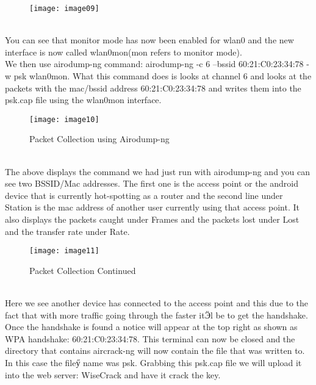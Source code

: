\documentclass[12pt, titlepage]{article}
\begin{document}
\begin{figure}[h]
\centering
\texttt{[image: image09]}
\end{figure}
\\
You can see that monitor mode has now been enabled for wlan0 and the new interface is now called wlan0mon(mon refers to monitor mode).  
\\
We then use airodump-ng command: airodump-ng -c 6 --bssid 60:21:C0:23:34:78 -w psk wlan0mon.  What this command does is looks at channel 6 and looks at the packets with the mac/bssid address 60:21:C0:23:34:78 and writes them into the psk.cap file using the wlan0mon interface.  
\\
\begin{figure}[h]
\centering
\texttt{[image: image10]}
\caption{Packet Collection using Airodump-ng}
\end{figure}
\\
The above displays the command we had just run with airodump-ng and you can see two BSSID/Mac addresses.  The first one is the access point or the android device that is currently hot-spotting as a router and the second line under Station is the mac address of another user currently using that access point.  It also displays the packets caught under Frames and the packets lost under Lost and the transfer rate under Rate. 
\\
\begin{figure}[h]
\centering
\texttt{[image: image11]}
\caption{Packet Collection Continued}
\end{figure}
\\
Here we see another device has connected to the access point and this due to the fact that with more traffic going through the faster itӬl be to get the handshake.  Once the handshake is found a notice will appear at the top right as shown as WPA handshake: 60:21:C0:23:34:78.
This terminal can now be closed and the directory that contains aircrack-ng will now contain the file that was written to.  In this case the fileӳ name was psk.  Grabbing this psk.cap file we will upload it into the web server: WiseCrack and have it crack the key.
\end{document}
